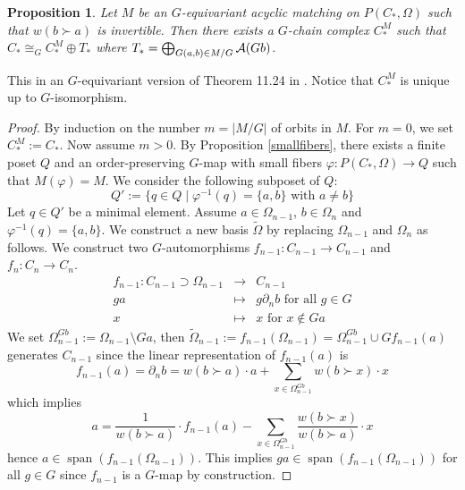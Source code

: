 \documentclass{elsarticle}
\newtheorem{prop}[df]{Proposition}
\def\span{\operatorname{span}}
\begin{document}
\begin{prop}
\label{eqthm}
Let $M$ be an $G$-equivariant acyclic matching on $P(C_*,\Omega)$ such that $w(b\succ a)$ is invertible. Then there exists a $G$-chain complex $C_*^M$ such that $C_*\cong_G C_*^M\oplus T_*$ where $T_*=\bigoplus_{G(a,b)\in M/G}{\cal A}(Gb)$.
\end{prop}
This in an $G$-equivariant version of Theorem 11.24 in \cite[Chapter 11.3]{buch}. Notice that $C_*^M$ is unique up to $G$-isomorphism.
\begin{proof}
By induction on the number $m=|M/G|$ of orbits in $M$. For $m=0$, we set $C_*^M:=C_*$. Now assume $m>0$. By Proposition \ref{smallfibers}, there exists a finite poset $Q$ and an order-preserving $G$-map with small fibers $\varphi:P(C_*,\Omega)\longrightarrow Q$ such that $M(\varphi)=M$. We consider the following subposet of $Q$:
\[
Q':=\{q\in Q\mid\varphi^{-1}(q)=\{a,b\}\text{ with }a\not=b\}
\]
Let $q\in Q'$ be a minimal element. Assume $a\in\Omega_{n-1}$, $b\in\Omega_n$ and $\varphi^{-1}(q)=\{a,b\}$. We construct a new basis $\widetilde\Omega$ by replacing $\Omega_{n-1}$ and $\Omega_n$ as follows. We construct two $G$-automorphisms $f_{n-1}:C_{n-1}\longrightarrow C_{n-1}$ and $f_n:C_n\longrightarrow C_n$.
\begin{eqnarray*}
f_{n-1}:C_{n-1}\supset\Omega_{n-1}&\longrightarrow&C_{n-1}\\
ga&\longmapsto&g\partial_n b\text{ for all $g\in G$}\\
x&\longmapsto&x\text{ for $x\not\in Ga$}
\end{eqnarray*}
We set $\Omega^{Gb}_{n-1}:=\Omega_{n-1}\setminus Ga$, then $\widetilde\Omega_{n-1}:=f_{n-1}(\Omega_{n-1})=\Omega^{Gb}_{n-1}\cup Gf_{n-1}(a)$ generates $C_{n-1}$ since the linear representation of $f_{n-1}(a)$ is
\[
f_{n-1}(a)=\partial_n b=w(b\succ a)\cdot a+\sum_{x\in\Omega^{Gb}_{n-1}}w(b\succ x)\cdot x
\]
which implies
\[
a=\frac 1{w(b\succ a)}\cdot f_{n-1}(a)-\sum_{x\in\Omega^{Gb}_{n-1}}\frac{w(b\succ x)}{w(b\succ a)}\cdot x
\]
hence $a\in\span(f_{n-1}(\Omega_{n-1}))$. This implies $ga\in\span(f_{n-1}(\Omega_{n-1}))$ for all $g\in G$ since $f_{n-1}$ is a $G$-map by construction.


\end{proof}
\end{document}
